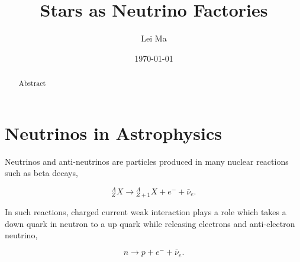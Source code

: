 \documentclass[%
 aip,
 jmp,%
 amsmath,amssymb,
 reprint,%
]{revtex4-1}
\begin{document}
\preprint{}

\title[Stars as Neutrino Factories]{Stars as Neutrino Factories}%

\author{Lei Ma}
%


\date{\today}%
\begin{abstract}
Abstract
\end{abstract}


\maketitle


\section{\label{sec:neutrinos_in_astrophysics}Neutrinos in Astrophysics}


Neutrinos and anti-neutrinos are particles produced in many nuclear reactions such as beta decays,

\begin{equation}
{}^A_Z X \to {}_{Z+1}^AX + e^- +\bar \nu_e .
\end{equation}

In such reactions, charged current weak interaction plays a role which takes a down quark in neutron to a up quark while releasing electrons and anti-electron neutrino,

\begin{equation}
n\to p + e^- + \bar \nu_e .
\end{equation}
\end{document}
